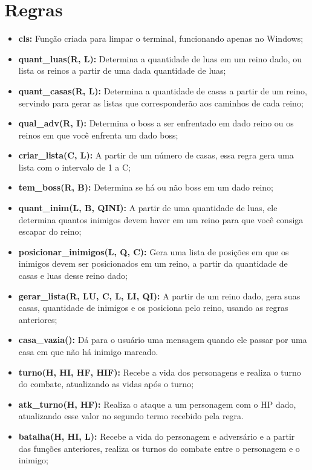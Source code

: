 \section{Regras}
	\begin{itemize}
		\item \textbf{cls:} Função criada para limpar o terminal, funcionando apenas no Windows;
		\item \textbf{quant\_luas(R, L):} Determina a quantidade de luas em um reino dado, ou lista os reinos a partir de uma dada quantidade de luas;
		\item \textbf{quant\_casas(R, L):} Determina a quantidade de casas a partir de um reino, servindo para gerar as listas que corresponderão aos caminhos de cada reino;
		\item \textbf{qual\_adv(R, I):} Determina o boss a ser enfrentado em dado reino ou os reinos em que você enfrenta um dado boss;
		\item \textbf{criar\_lista(C,  L):} A partir de um número de casas, essa regra gera uma lista com o intervalo de 1 a C;
		\item \textbf{tem\_boss(R, B):} Determina se há ou não boss em um dado reino;
		\item \textbf{quant\_inim(L, B, QINI):} A partir de uma quantidade de luas, ele determina quantos inimigos devem haver em um reino para que você consiga escapar do reino;
		\item \textbf{posicionar\_inimigos(L, Q, C):} Gera uma lista de posições em que os inimigos devem ser posicionados em um reino, a partir da quantidade de casas e luas desse reino dado;
		\item \textbf{gerar\_lista(R, LU, C, L, LI, QI):} A partir de um reino dado, gera suas casas, quantidade de inimigos e os posiciona pelo reino, usando as regras anteriores;
		\item \textbf{casa\_vazia():} Dá para o usuário uma mensagem quando ele passar por uma casa em que não há inimigo marcado.
		\item \textbf{turno(H, HI, HF, HIF):} Recebe a vida dos personagens e realiza o turno do combate, atualizando as vidas após o turno;
		\item \textbf{atk\_turno(H, HF):} Realiza o ataque a um personagem com o HP dado, atualizando esse valor no segundo termo recebido pela regra.
		\item \textbf{batalha(H, HI, L):} Recebe a vida do personagem e adversário e a partir das funções anteriores, realiza os turnos do combate entre o personagem e o inimigo;

\end{itemize}
